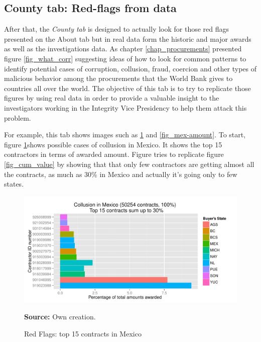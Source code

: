 \subsection{County tab: Red-flags from data}

After that, the \textit{County tab} is designed to actually look for those red flags presented on the About tab but in real data form the historic and major awards as well as the investigations data. As chapter \ref{chap_procurements} presented figure \ref{fig_what_corr} suggesting ideas of how to look for common patterns to identify potential cases of corruption, collusion, fraud, coercion and other types of malicious behavior among the procurements that the World Bank gives to countries all over the world. The objective of this tab is to try to replicate those figures by using real data in order to provide a valuable insight to the investigators working in the Integrity Vice Presidency to help them attack this problem.

For example, this tab shows images such as \ref{fig_mex-top15} and \ref{fig_mex-amount}. To start, figure  \ref{fig_mex-top15}shows possible cases of collusion in Mexico. It shows the top 15 contractors in terms of awarded amount. Figure tries to replicate figure \ref{fig_cum_value} by showing that that only few contractors are getting almost all the contracts, as much as 30\% in Mexico and actually it's going only to few states.
\begin{figure}[H]
\begin{center}
\caption{Red Flags: top 15 contracts in Mexico}
\label{fig_mex-top15}
\includegraphics[width=1.05\textwidth,keepaspectratio]{../img/mex-top-15.pdf}
\end{center}
\noindent \footnotesize{\textbf{Source:} Own creation.}
\end{figure}


